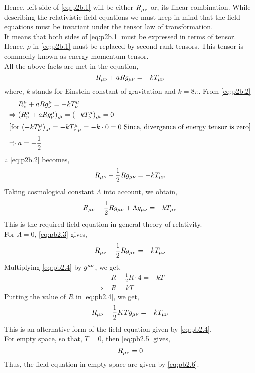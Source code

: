 \documentclass[../main-sheet.tex]{subfiles}
\begin{document}
\begin{soln}
            Hence, left side of \eqref{eq:p2b.1} will be either \(R_{\mu\nu}\) or, its linear combination. While describing the relativistic field equations we must keep in mind that the field equations must be invariant under the tensor law of transformation.\\
            It means that both sides of \eqref{eq:p2b.1} must be expressed in terms of tensor. Hence, \(\rho\) in \eqref{eq:p2b.1} must be replaced by second rank tensors. This tensor is commonly known as energy momentum tensor.\\
            All the above facts are met in the equation,
            \begin{equation}
                R_{{\mu\nu}}+aRg_{{\mu\nu}}=-kT_{{\mu\nu}}\label{eq:p2b.2}
            \end{equation}
            where, \(k\) stands for Einstein constant of gravitation and \(k=8\pi\). From \eqref{eq:p2b.2}
            \begin{align*}
                & R_\nu^\mu+aRg_\nu^\mu=-kT_\nu^\mu\\
                \Rightarrow\;& (R_\nu^\mu+aRg_\nu^\mu)_{,\mu}=(-kT_\nu^\mu)_{,\mu}=0\\\intertext{[{for \((-kT_\nu^\mu)_{,\mu}=-kT_{\nu,\mu}^\mu=-k\cdot 0=0\) Since, divergence of energy tensor is zero}]}
                \Rightarrow\;& a=-\frac{1}{2}
            \end{align*}
            \(\therefore\) \eqref{eq:p2b.2} becomes,
            \[R_{{\mu\nu}}-\frac{1}{2}Rg_{{\mu\nu}}=-kT_{{\mu\nu}}\]
            Taking cosmological constant \(\Lambda\) into account, we obtain,
            \begin{equation}
                R_{{\mu\nu}}-\frac{1}{2}Rg_{{\mu\nu}}+\Lambda g_{\mu\nu}=-kT_{{\mu\nu}}\label{eq:pb2.3}
            \end{equation}
            This is the required field equation in general theory of relativity.\\
            For \(\Lambda=0\), \eqref{eq:pb2.3} gives,
            \begin{equation}
                R_{{\mu\nu}}-\frac{1}{2}Rg_{{\mu\nu}}=-kT_{{\mu\nu}}\label{eq:pb2.4}
            \end{equation}
            Multiplying \eqref{eq:pb2.4} by \(g^{\mu\nu}\), we get,
            \begin{align*}
                &R-\frac{1}{2}R\cdot4=-kT\\
                \Rightarrow\; &R=kT
            \end{align*}
            Putting the value of \(R\) in \eqref{eq:pb2.4}, we get,
            \begin{equation}
                R_{{\mu\nu}}-\frac{1}{2}KTg_{{\mu\nu}}=-kT_{{\mu\nu}}
                \label{eq:pb2.5}
            \end{equation}
            This is an alternative form of the field equation given by \eqref{eq:pb2.4}.\\
            For empty space, so that, \(T=0\), then \eqref{eq:pb2.5} gives, 
            \begin{equation}
                R_{{\mu\nu}}=0
                \label{eq:pb2.6}
            \end{equation}
            Thus, the field equation in empty space are given by \eqref{eq:pb2.6}.
        \end{soln}
\end{document}
